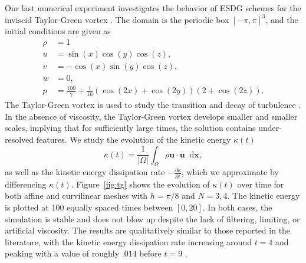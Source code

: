 \documentclass[10pt]{amsart}
\theoremstyle{definition}
\theoremstyle{lemma}
\theoremstyle{theorem}
\theoremstyle{assumption}
\newcommand{\pd}[2]{\frac{\partial#1}{\partial#2}}
\newcommand{\LRp}[1]{\left( #1 \right)}
\newcommand{\LRb}[1]{\left| #1 \right|}
\newcommand*\diff[1]{\mathop{}\!{\mathrm{d}#1}} %
\begin{document}
{Our last numerical experiment investigates the behavior of ESDG schemes for the inviscid Taylor-Green vortex \cite{ae1937mechanism, gassner2016split, crean2018entropy}.  The domain is the periodic box $[-\pi,\pi]^3$, and the initial conditions are given as
\begin{align*}
\rho &= 1\\
u &= \sin(x)\cos(y)\cos(z),\\
v &= -\cos(x)\sin(y)\cos(z),\\ 
w &= 0,\\
p &= \frac{100}{\gamma} + \frac{1}{16} \LRp{\cos(2x) + \cos(2y)}\LRp{2+\cos(2z)}.
\end{align*}
The Taylor-Green vortex is used to study the transition and decay of turbulence \cite{debonis2013solutions}.  In the absence of viscosity, the Taylor-Green vortex develops smaller and smaller scales, implying that for sufficiently large times, the solution contains under-resolved features.  We study the evolution of the kinetic energy $\kappa(t)$ 
\[
\kappa(t) =\frac{1}{\LRb{\Omega}} \int_{\Omega} \rho \bm{u}\cdot\bm{u} \diff{\bm{x}},
\]
as well as the kinetic energy dissipation rate $-\pd{\kappa}{t}$, which we approximate by differencing $\kappa(t)$.  Figure~\ref{fig:tg} shows the evolution of $\kappa(t)$ over time for both affine and curvilinear meshes with $h = \pi/8$ and $N = 3, 4$.  The kinetic energy is plotted at 100 equally spaced times between $[0,20]$.  In both cases, the simulation is stable and does not blow up despite the lack of filtering, limiting, or artificial viscosity.  The results are qualitatively similar to those reported in the literature, with the kinetic energy dissipation rate increasing around $t = 4$ and peaking with a value of roughly $.014$ before $t = 9$ \cite{debonis2013solutions, gassner2016split}.  

}
\end{document}
